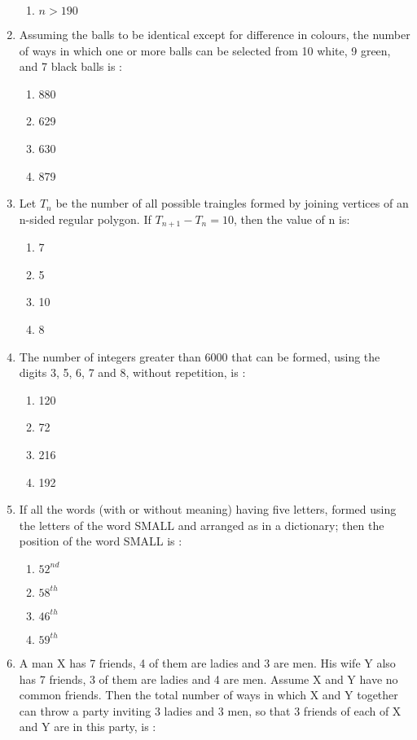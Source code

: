 \begin{enumerate}[label=\arabic*.,ref=\thesubsection.\theenumi]
\begin{enumerate}
\item $n > 190$\\
\end{enumerate}  
\item Assuming the balls to be identical except for difference in colours, the number of ways in which one  or more balls can be selected from 10 white, 9 green, and 7 black balls is :
\begin{enumerate}
\item 880
\item 629
\item 630
\item 879\\
\end{enumerate}
\item Let $T_n$ be the number of all possible traingles formed by joining vertices of an n-sided regular polygon. If $T_{n+1}-T_n = 10$, then the value of n is:
\begin{enumerate}
\item 7
\item 5
\item 10
\item 8\\
\end{enumerate}
\item The number of integers greater than 6000 that can be formed, using the digits 3, 5, 6, 7 and 8, without repetition, is :
\begin{enumerate}
\item 120
\item 72
\item 216
\item 192\\
\end{enumerate}
\item If all the words (with or without meaning) having five letters, formed using the letters of the word SMALL and arranged as in a dictionary; then the position of the word SMALL is :
\begin{enumerate}
\item $52^{nd}$
\item $58^{th}$
\item $46^{th}$
\item $59^{th}$\\
\end{enumerate}
\item A man X has 7 friends, 4 of them are ladies and 3 are men. His wife Y also has 7 friends, 3 of them are ladies and 4 are men. Assume X and Y have no common friends. Then the total number of ways in which X and Y together can throw a party inviting 3 ladies and 3 men, so that 3 friends of each of X and Y are in this party, is :

\end{enumerate}
